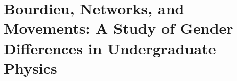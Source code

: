 \chapter[Bourdieu, Networks, and Movements][]{Bourdieu, Networks, and Movements: A Study of Gender Differences in Undergraduate Physics}